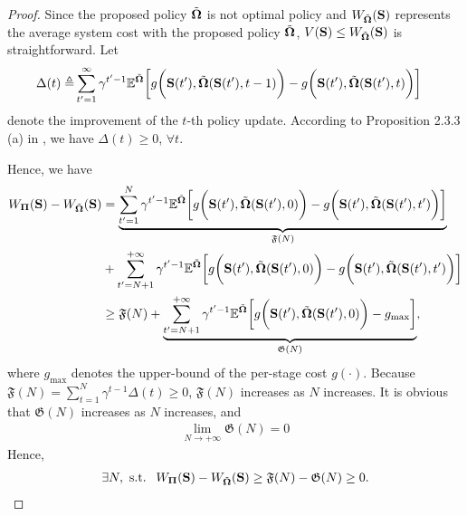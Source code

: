 \begin{proof}
    Since the proposed policy $\tilde{\boldsymbol{\Omega}}$ is not optimal policy and $W_{\tilde{\boldsymbol{\Omega}}}(\mathbf{S})$ represents the average system cost with the proposed policy $\tilde{\boldsymbol{\Omega}}$, $V(\mathbf{S}) \leq W_{\tilde{\boldsymbol{\Omega}}}(\mathbf{S})$ is straightforward.
    Let 
    \begin{align*}
        \Delta(t) \triangleq &
        \sum_{t'=1}^{\infty} \gamma^{t'-1}
        \mathbb{E}^{ \tilde{\boldsymbol{\Omega}} } \bigg[
            g\bigg(\mathbf{S}(t'), \tilde{\boldsymbol{\Omega}}(\mathbf{S}(t'),t-1)\bigg)
            -  g\bigg(\mathbf{S}(t'), \tilde{\boldsymbol{\Omega}}(\mathbf{S}(t'),t)\bigg)
        \bigg]
    \end{align*}
    denote the improvement of the $t$-th policy update.
    According to Proposition 2.3.3 (a) in \cite{dp-control}, we have $\Delta(t)\geq 0$, $\forall t$.

    Hence, we have
    \begin{align*}
    W_{\mathbf{\Pi}}(\mathbf{S})- W_{\tilde{\boldsymbol{\Omega}}}(\mathbf{S})
    &= 
    \underbrace{\sum_{t'=1}^{N} \gamma^{t'-1} \mathbb{E}^{ \tilde{\boldsymbol{\Omega}} } \bigg[
        g\bigg(\mathbf{S}(t'), \tilde{\boldsymbol{\Omega}}(\mathbf{S}(t'),0)\bigg)
        - 	g\bigg(\mathbf{S}(t'), \tilde{\boldsymbol{\Omega}}(\mathbf{S}(t'),t')\bigg)
    \bigg]}_{\mathfrak{F}(N)}\\
    &+\sum_{t'=N+1}^{+\infty} \gamma^{t'-1} \mathbb{E}^{ \tilde{\boldsymbol{\Omega}} } \bigg[
        g\bigg(\mathbf{S}(t'), \tilde{\boldsymbol{\Omega}}(\mathbf{S}(t'),0)\bigg)
        - 	g\bigg(\mathbf{S}(t'), \tilde{\boldsymbol{\Omega}}(\mathbf{S}(t'),t')\bigg)
    \bigg]\\
    &\geq \mathfrak{F}(N) + \underbrace{\sum_{t'=N+1}^{+\infty} \gamma^{t'-1} \mathbb{E}^{ \tilde{\boldsymbol{\Omega}} } \bigg[
        g\bigg(\mathbf{S}(t'), \tilde{\boldsymbol{\Omega}}(\mathbf{S}(t'),0)\bigg)
        - 	g_{\max}
    \bigg]}_{\mathfrak{G}(N)},
    \end{align*}
    where $g_{\max}$ denotes the upper-bound of the per-stage cost $g(\cdot)$.
    Because  $\mathfrak{F}(N)=\sum_{t=1}^{N}\gamma^{t-1}\Delta(t)\geq 0$, $\mathfrak{F}(N)$ increases as $N$ increases.
    It is obvious that $\mathfrak{G}(N)$ increases as $N$ increases, and 
    \begin{align*}
    \lim\limits_{N\to+\infty}\mathfrak{G}(N)=0
    \end{align*}
    Hence, 
    \begin{align*}
    \exists N,\ \mbox{s.t. }\ W_{\mathbf{\Pi}}(\mathbf{S})- W_{\tilde{\boldsymbol{\Omega}}}(\mathbf{S})\geq \mathfrak{F}(N)-\mathfrak{G}(N) \geq 0.
    \end{align*}
\end{proof}

